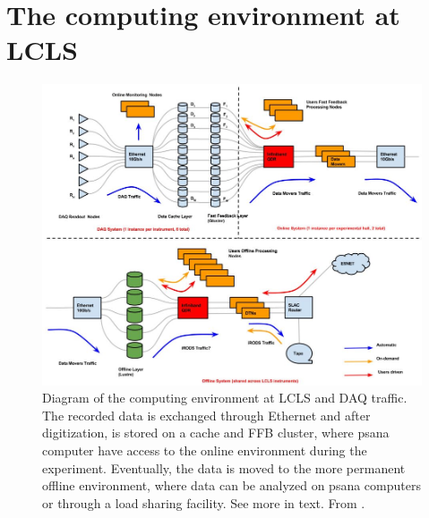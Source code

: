\section{The computing environment at LCLS}\label{sec:LCLS-computing}
\begin{figure}
	\centering
		\includegraphics[width=1.00\textwidth]{images/daq-architecture.JPG}
	\caption[Diagram of the computing environment at LCLS and DAQ traffic.]{Diagram of the computing environment at LCLS and DAQ traffic. The recorded data is exchanged through Ethernet and after digitization, is stored on a cache and FFB cluster, where psana computer have access to the online environment during the experiment. Eventually, the data is moved to the more permanent offline environment, where data can be analyzed on psana computers or through a load sharing facility. See more in text. From \citep{Amadeo-2016-SLAC}.}
	\label{fig:daq-architecture}
\end{figure}
